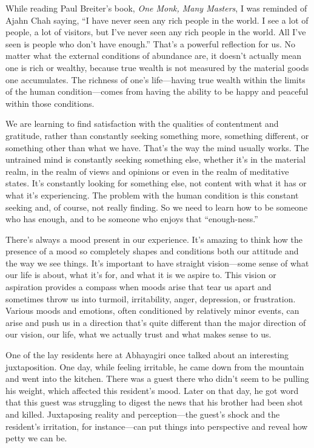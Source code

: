 While reading Paul Breiter's book, \emph{One Monk, Many Masters}, I was 
reminded of Ajahn Chah saying, ``I have never seen any rich people in 
the world. I see a lot of people, a lot of visitors, but I've never 
seen any rich people in the world. All I've seen is people who don't 
have enough.'' That's a powerful reflection for us. No matter what the 
external conditions of abundance are, it doesn't actually mean one is 
rich or wealthy, because true wealth is not measured by the material 
goods one accumulates. The richness of one's life---having true wealth 
within the limits of the human condition---comes from having the 
ability to be happy and peaceful within those conditions.

We are learning to find satisfaction with the qualities of contentment 
and gratitude, rather than constantly seeking something more, something 
different, or something other than what we have. That's the way the 
mind usually works. The untrained mind is constantly seeking something 
else, whether it's in the material realm, in the realm of views and 
opinions or even in the realm of meditative states. It's constantly 
looking for something else, not content with what it has or what it's 
experiencing. The problem with the human condition is this constant 
seeking and, of course, not really finding. So we need to learn how to 
be someone who has enough, and to be someone who enjoys that 
``enough-ness.''


There's always a mood present in our experience. It's amazing to think 
how the presence of a mood so completely shapes and conditions both our 
attitude and the way we see things. It's important to have straight 
vision---some sense of what our life is about, what it's for, and what 
it is we aspire to. This vision or aspiration provides a compass when 
moods arise that tear us apart and sometimes throw us into turmoil, 
irritability, anger, depression, or frustration. Various moods and 
emotions, often conditioned by relatively minor events, can arise and 
push us in a direction that's quite different than the major direction 
of our vision, our life, what we actually trust and what makes sense to 
us.

One of the lay residents here at Abhayagiri once talked about an 
interesting juxtaposition. One day, while feeling irritable, he came 
down from the mountain and went into the kitchen. There was a guest 
there who didn't seem to be pulling his weight, which affected this 
resident's mood. Later on that day, he got word that this guest was 
struggling to digest the news that his brother had been shot and 
killed. Juxtaposing reality and perception---the guest's shock and the 
resident's irritation, for instance---can put things into perspective 
and reveal how petty we can be.

